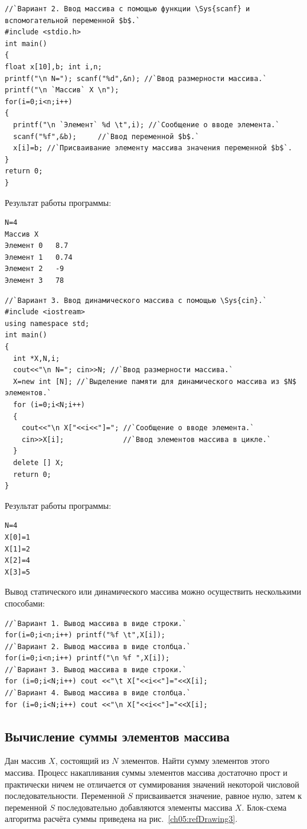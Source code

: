 \begin{lstlisting}
//`Вариант 2. Ввод массива с помощью функции \Sys{scanf} и вспомогательной переменной $b$.`
#include <stdio.h>
int main()
{
float x[10],b; int i,n; 
printf("\n N="); scanf("%d",&n); //`Ввод размерности массива.`
printf("\n `Массив` X \n"); 
for(i=0;i<n;i++) 
{ 
  printf("\n `Элемент` %d \t",i); //`Сообщение о вводе элемента.`
  scanf("%f",&b);     //`Ввод переменной $b$.`
  x[i]=b; //`Присваивание элементу массива значения переменной $b$`.
} 
return 0;
}
\end{lstlisting}

Результат работы программы:
\begin{verbatim}
N=4 
Массив X 
Элемент 0 	8.7 
Элемент 1 	0.74 
Элемент 2 	-9 
Элемент 3 	78 
\end{verbatim}

\begin{lstlisting}
//`Вариант 3. Ввод динамического массива с помощью \Sys{cin}.`
#include <iostream>
using namespace std;
int main()
{
  int *X,N,i;
  cout<<"\n N="; cin>>N; //`Ввод размерности массива.`
  X=new int [N]; //`Выделение памяти для динамического массива из $N$ элементов.`
  for (i=0;i<N;i++)
  {
    cout<<"\n X["<<i<<"]="; //`Сообщение о вводе элемента.`
    cin>>X[i];              //`Ввод элементов массива в цикле.`
  }
  delete [] X;
  return 0;
}
\end{lstlisting}

Результат работы программы:
\begin{verbatim}
N=4 
X[0]=1 
X[1]=2 
X[2]=4 
X[3]=5 
\end{verbatim}

Вывод статического или динамического массива можно осуществить несколькими способами:

\begin{lstlisting}
//`Вариант 1. Вывод массива в виде строки.`
for(i=0;i<n;i++) printf("%f \t",X[i]);
//`Вариант 2. Вывод массива в виде столбца.`
for(i=0;i<n;i++) printf("\n %f ",X[i]);
//`Вариант 3. Вывод массива в виде строки.`
for (i=0;i<N;i++) cout <<"\t X["<<i<<"]="<<X[i];
//`Вариант 4. Вывод массива в виде столбца.`
for (i=0;i<N;i++) cout <<"\n X["<<i<<"]="<<X[i];
\end{lstlisting}

\subsection[Вычисление суммы элементов массива]{Вычисление суммы элементов массива}
Дан массив $X$, состоящий из $N$ элементов. Найти сумму элементов этого массива.
Процесс накапливания суммы элементов массива достаточно прост и практически
ничем не отличается от суммирования значений некоторой числовой последовательности. Переменной $S$
присваивается значение, равное нулю, затем к переменной $S$ последовательно добавляются элементы
 массива $X$. Блок-схема
алгоритма расчёта суммы приведена на рис.~\ref{ch05:refDrawing3}.

